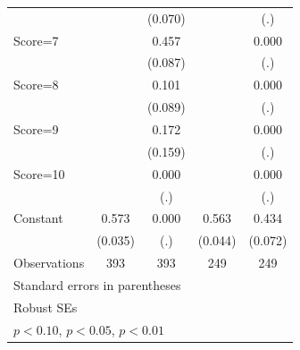 \begin{table}[htbp]
\begin{tabular}{l*{4}{c}}
                &                  &  (0.070)         &                  &      (.)         \\
Score=7         &                  &    0.457\sym{***}&                  &    0.000         \\
                &                  &  (0.087)         &                  &      (.)         \\
Score=8         &                  &    0.101         &                  &    0.000         \\
                &                  &  (0.089)         &                  &      (.)         \\
Score=9         &                  &    0.172         &                  &    0.000         \\
                &                  &  (0.159)         &                  &      (.)         \\
Score=10        &                  &    0.000         &                  &    0.000         \\
                &                  &      (.)         &                  &      (.)         \\
Constant        &    0.573\sym{***}&    0.000         &    0.563\sym{***}&    0.434\sym{***}\\
                &  (0.035)         &      (.)         &  (0.044)         &  (0.072)         \\
\hline
Observations    &      393         &      393         &      249         &      249         \\
\hline\hline
\multicolumn{5}{l}{\footnotesize Standard errors in parentheses}\\
\multicolumn{5}{l}{\footnotesize Robust SEs}\\
\multicolumn{5}{l}{\footnotesize \sym{*} \(p<0.10\), \sym{**} \(p<0.05\), \sym{***} \(p<0.01\)}\\
\end{tabular}
\end{table}
